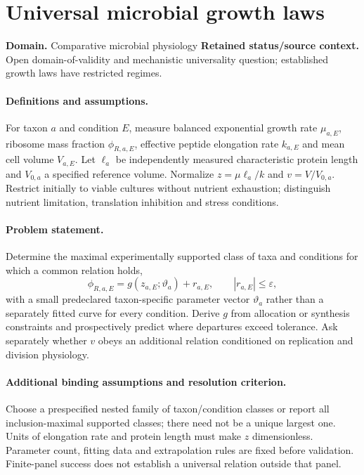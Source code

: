 \documentclass[11pt]{article}
\begin{document}
\section*{Universal microbial growth laws}
\label{prob:056}
\label{rank:220}
\par\smallskip

\noindent\textbf{Domain.} Comparative microbial physiology \quad \textbf{Retained status/source context.} Open domain-of-validity and mechanistic universality question; established growth laws have restricted regimes.
\paragraph{Definitions and assumptions.} For taxon $a$ and condition $E$, measure balanced exponential growth rate $\mu_{a,E}$, ribosome mass fraction $\phi_{R,a,E}$, effective peptide elongation rate $k_{a,E}$ and mean cell volume $V_{a,E}$. Let $\ell_a$ be independently measured characteristic protein length and $V_{0,a}$ a specified reference volume. Normalize $z=\mu\ell_a/k$ and $v=V/V_{0,a}$. Restrict initially to viable cultures without nutrient exhaustion; distinguish nutrient limitation, translation inhibition and stress conditions.
\paragraph{Problem statement.} Determine the maximal experimentally supported class of taxa and conditions for which a common relation holds,
\[\phi_{R,a,E}=g(z_{a,E};\vartheta_a)+r_{a,E},\qquad |r_{a,E}|\le\varepsilon,\]
with a small predeclared taxon-specific parameter vector $\vartheta_a$ rather than a separately fitted curve for every condition. Derive $g$ from allocation or synthesis constraints and prospectively predict where departures exceed tolerance. Ask separately whether $v$ obeys an additional relation conditioned on replication and division physiology.
\paragraph{Additional binding assumptions and resolution criterion.} Choose a prespecified nested family of taxon/condition classes or report all inclusion-maximal supported classes; there need not be a unique largest one. Units of elongation rate and protein length must make $z$ dimensionless. Parameter count, fitting data and extrapolation rules are fixed before validation. Finite-panel success does not establish a universal relation outside that panel.
\end{document}
